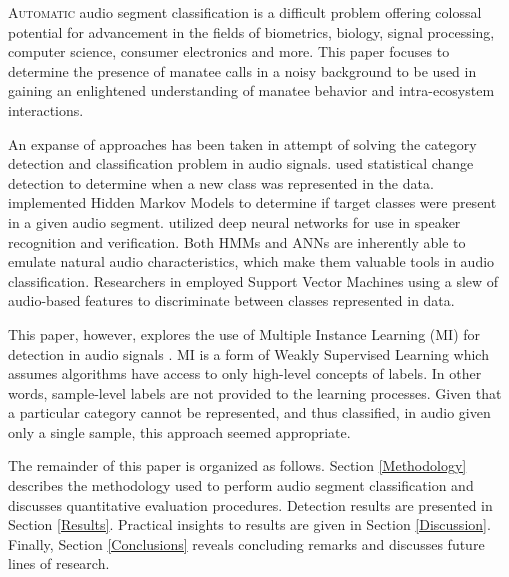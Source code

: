 \documentclass[conference]{IEEEtran}
\begin{document}
\lettrine{A}{utomatic} audio segment classification is a difficult problem offering colossal potential for advancement in the fields of biometrics, biology, signal processing, computer science, consumer electronics and more.  This paper focuses to determine the presence of manatee calls in a noisy background to be used in gaining an enlightened understanding of manatee behavior and intra-ecosystem interactions. 

An expanse of approaches has been taken in attempt of solving the category detection and classification problem in audio signals.  \cite{Liu,NonStationarity} used statistical change detection to determine when a new class was represented in the data.   \cite{HMMBird,HMMSpeechSegmentation,InstrumentRecognition} implemented Hidden Markov Models to determine if target classes were present in a given audio segment.  \cite{DNNLanguage,FilterBankDeepNN,SpeakerRecognitionANN} utilized deep neural networks for use in speaker recognition and verification.  Both HMMs and ANNs are inherently able to emulate natural audio characteristics, which make them valuable tools in audio classification.  Researchers in \cite{miSVM,Birds,AudioClassificationMachineLearning,WaveletsSupportVector,ContentBased,SVMSlides} employed Support Vector Machines using a slew of audio-based features to discriminate between classes represented in data.  

This paper, however, explores the use of Multiple Instance Learning (MI) for detection in audio signals \cite{WeaklySupervisedAudio,MISlides,MISurvey,miACE}.  MI is a form of Weakly Supervised Learning which assumes algorithms have access to only high-level concepts of labels.  In other words, sample-level labels are not provided to the learning processes.  Given that a particular category cannot be represented, and thus classified, in audio given only a single sample, this approach seemed appropriate. 

The remainder of this paper is organized as follows. Section \ref{Methodology} describes the methodology used to perform audio segment classification and discusses quantitative evaluation procedures. Detection results are presented in Section \ref{Results}. Practical insights to results are given in Section \ref{Discussion}.  Finally, Section \ref{Conclusions} reveals concluding remarks and discusses future lines of research.

\end{document}
